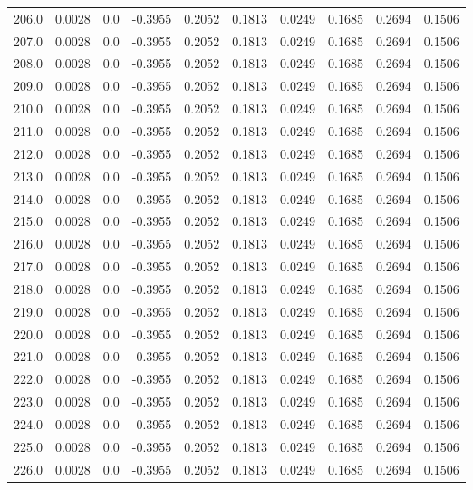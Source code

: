 \begin{longtable}{lrrrrrrrrr}
206.0 & 0.0028 & 0.0 & -0.3955 & 0.2052 & 0.1813 & 0.0249 & 0.1685 & 0.2694 & 0.1506 \\
207.0 & 0.0028 & 0.0 & -0.3955 & 0.2052 & 0.1813 & 0.0249 & 0.1685 & 0.2694 & 0.1506 \\
208.0 & 0.0028 & 0.0 & -0.3955 & 0.2052 & 0.1813 & 0.0249 & 0.1685 & 0.2694 & 0.1506 \\
209.0 & 0.0028 & 0.0 & -0.3955 & 0.2052 & 0.1813 & 0.0249 & 0.1685 & 0.2694 & 0.1506 \\
210.0 & 0.0028 & 0.0 & -0.3955 & 0.2052 & 0.1813 & 0.0249 & 0.1685 & 0.2694 & 0.1506 \\
211.0 & 0.0028 & 0.0 & -0.3955 & 0.2052 & 0.1813 & 0.0249 & 0.1685 & 0.2694 & 0.1506 \\
212.0 & 0.0028 & 0.0 & -0.3955 & 0.2052 & 0.1813 & 0.0249 & 0.1685 & 0.2694 & 0.1506 \\
213.0 & 0.0028 & 0.0 & -0.3955 & 0.2052 & 0.1813 & 0.0249 & 0.1685 & 0.2694 & 0.1506 \\
214.0 & 0.0028 & 0.0 & -0.3955 & 0.2052 & 0.1813 & 0.0249 & 0.1685 & 0.2694 & 0.1506 \\
215.0 & 0.0028 & 0.0 & -0.3955 & 0.2052 & 0.1813 & 0.0249 & 0.1685 & 0.2694 & 0.1506 \\
216.0 & 0.0028 & 0.0 & -0.3955 & 0.2052 & 0.1813 & 0.0249 & 0.1685 & 0.2694 & 0.1506 \\
217.0 & 0.0028 & 0.0 & -0.3955 & 0.2052 & 0.1813 & 0.0249 & 0.1685 & 0.2694 & 0.1506 \\
218.0 & 0.0028 & 0.0 & -0.3955 & 0.2052 & 0.1813 & 0.0249 & 0.1685 & 0.2694 & 0.1506 \\
219.0 & 0.0028 & 0.0 & -0.3955 & 0.2052 & 0.1813 & 0.0249 & 0.1685 & 0.2694 & 0.1506 \\
220.0 & 0.0028 & 0.0 & -0.3955 & 0.2052 & 0.1813 & 0.0249 & 0.1685 & 0.2694 & 0.1506 \\
221.0 & 0.0028 & 0.0 & -0.3955 & 0.2052 & 0.1813 & 0.0249 & 0.1685 & 0.2694 & 0.1506 \\
222.0 & 0.0028 & 0.0 & -0.3955 & 0.2052 & 0.1813 & 0.0249 & 0.1685 & 0.2694 & 0.1506 \\
223.0 & 0.0028 & 0.0 & -0.3955 & 0.2052 & 0.1813 & 0.0249 & 0.1685 & 0.2694 & 0.1506 \\
224.0 & 0.0028 & 0.0 & -0.3955 & 0.2052 & 0.1813 & 0.0249 & 0.1685 & 0.2694 & 0.1506 \\
225.0 & 0.0028 & 0.0 & -0.3955 & 0.2052 & 0.1813 & 0.0249 & 0.1685 & 0.2694 & 0.1506 \\
226.0 & 0.0028 & 0.0 & -0.3955 & 0.2052 & 0.1813 & 0.0249 & 0.1685 & 0.2694 & 0.1506 \\

\end{longtable}
